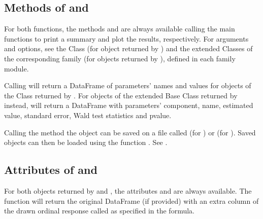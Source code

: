 \documentclass[letterpaper,10pt,english]{sphinxmanual}
\begin{document}
\subsection{Methods of  and }
\label{\detokenize{manual:methods-of-estimate-and-draw}}
\sphinxAtStartPar
For both functions, the methods  and  are always available calling the
main functions to print a summary and plot the results, respectively. For  arguments
and options, see  the  Class
(for object returned by )
and the extended  Classes of the corresponding
family (for objects returned by ), defined in each family module.

\sphinxAtStartPar
Calling  will return a DataFrame of parameters’ names and values for objects
of the Class  returned by . For objects of the extended Base Class  returned
by  instead, will return a DataFrame with parameters’ component, name, estimated value,
standard error, Wald test statistics and p\sphinxhyphen{}value.

\sphinxAtStartPar
Calling the method  the object can be saved on a file called 
(for ) or  (for ).
Saved objects can then be loaded using the function .
See {\hyperref[\detokenize{manual:save-load-example}]{}}.


\subsection{Attributes of  and }
\label{\detokenize{manual:attributes-of-estimate-and-draw}}
\sphinxAtStartPar
For both objects returned by  and , the attributes  and
 are always available. The function  will return the original DataFrame (if provided)
with an extra column of the drawn ordinal response called as specified in the formula.
\end{document}
